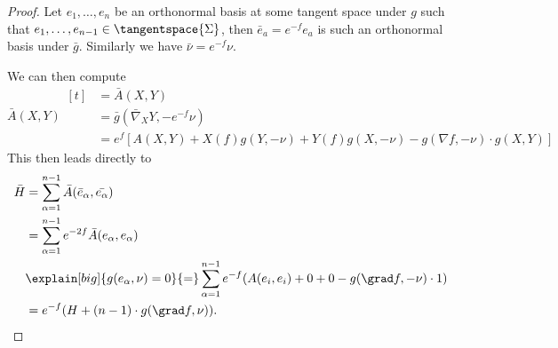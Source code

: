 \documentclass[titlepage,numbers=noenddot,headinclude,oneside,%
footinclude=true,cleardoublepage=empty,%
BCOR=5mm,paper=a4,fontsize=11pt,%
english,%
]{scrartcl}
\begin{document}
\begin{proof}
    Let \( e_1,\dotsc,e_n \) be an orthonormal basis at some tangent space under \( g \) such that \( e_1,\dotsc,e_{n-1}\in \tangentspace{\Sigma} \), then \( \bar{e}_a=e^{-f}e_a \) is such an orthonormal basis under \( \bar{g} \). Similarly we have \( \bar{\nu}=e^{-f}\nu \). 

    We can then compute     
    \begin{equation*}
        \bar{A}(X,Y)\begin{aligned}[t]
            &=\bar{A}(X,Y)\\
            &=\bar{g}(\bar{\nabla}_X Y,-e^{-f}\nu)\\
            &=e^{f}[A(X,Y)+X(f) g(Y,-\nu)+Y(f) g(X,-\nu)-g(\nabla f,-\nu)\cdot g(X,Y)]
        \end{aligned}
    \end{equation*}
    This then leads directly to
    \begin{equation*}
        \bar{H}\begin{aligned}[t]
            &=\sum_{\alpha=1}^{n-1}\bar{A}(\bar{e}_\alpha,\bar{e_\alpha})\\
            &=\sum_{\alpha=1}^{n-1}e^{-2f}\bar{A}(e_\alpha,e_\alpha)\\
            &\explain[big]{g(e_{\alpha},\nu)=0}{=}\sum_{\alpha=1}^{n-1}e^{-f}(A(e_i,e_i)+0+0-g(\grad f,-\nu)\cdot 1)\\
            &=e^{-f}(H+(n-1)\cdot g(\grad f,\nu)).
        \end{aligned}
    \end{equation*}
\end{proof}
% 
\printbibliography
\end{document}
